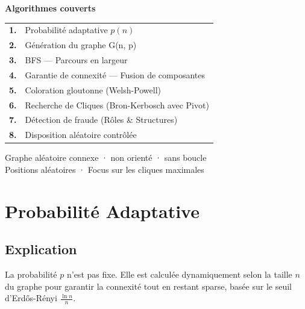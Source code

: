 \documentclass[12pt, a4paper]{article}
\begin{document}
\begin{titlepage}
    {\large\sffamily\bfseries Algorithmes couverts}\par
    \vspace{0.4cm}
    \begin{tabular}{cl}
        \textcolor{accent}{\bfseries 1.} & Probabilité adaptative $p(n)$ \\[4pt]
        \textcolor{accent}{\bfseries 2.} & Génération du graphe G(n, p) \\[4pt]
        \textcolor{accent}{\bfseries 3.} & BFS — Parcours en largeur \\[4pt]
        \textcolor{accent}{\bfseries 4.} & Garantie de connexité — Fusion de composantes \\[4pt]
        \textcolor{accent}{\bfseries 5.} & Coloration gloutonne (Welsh-Powell) \\[4pt]
        \textcolor{accent}{\bfseries 6.} & Recherche de Cliques (Bron-Kerbosch avec Pivot) \\[4pt]
        \textcolor{accent}{\bfseries 7.} & Détection de fraude (Rôles \& Structures) \\[4pt]
        \textcolor{accent}{\bfseries 8.} & Disposition aléatoire contrôlée \\
    \end{tabular}
    
    \vfill
    
    {\sffamily\color{gray!60}
        Graphe aléatoire connexe · non orienté · sans boucle \\
        \medskip
        Positions aléatoires · Focus sur les cliques maximales
    }
\end{titlepage}

\tableofcontents
\newpage

\section{Probabilité Adaptative}
\subsection{Explication}
\begin{tcolorbox}[explication]
    La probabilité $p$ n'est pas fixe. Elle est calculée dynamiquement selon la taille $n$ du graphe pour garantir la connexité tout en restant sparse, basée sur le seuil d'Erdős-Rényi $\frac{\ln n}{n}$.
\end{tcolorbox}
\end{document}
